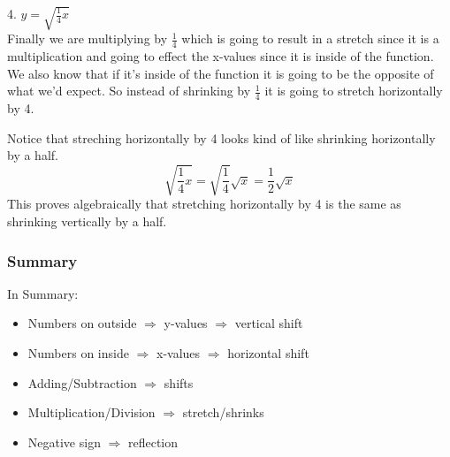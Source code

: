 4. $y=\sqrt{\frac{1}{4}x}$ \\
Finally we are multiplying by $\frac{1}{4}$ which is going to result in a stretch since it is a multiplication and going to effect the x-values since it is inside of the function. We also know that if it's inside of the function it is going to be the opposite of what we'd expect. So instead of shrinking by $\frac{1}{4}$ it is going to stretch horizontally by 4. \\

Notice that streching horizontally by 4 looks kind of like shrinking horizontally by a half. 
$$ \sqrt{\frac{1}{4}x} = \sqrt{\frac{1}{4}}\sqrt{x} = \frac{1}{2}\sqrt{x}$$
This proves algebraically that stretching horizontally by 4 is the same as shrinking vertically by a half. \\

\subsubsection*{Summary}
In Summary: \\
\begin{itemize}
	\item Numbers on outside $\Rightarrow$ y-values $\Rightarrow$ vertical shift
	\item Numbers on inside $\Rightarrow$ x-values $\Rightarrow$ horizontal shift
	\item  Adding/Subtraction $\Rightarrow$ shifts
	\item  Multiplication/Division $\Rightarrow$ stretch/shrinks
	\item Negative sign $\Rightarrow$ reflection
\end{itemize} 

